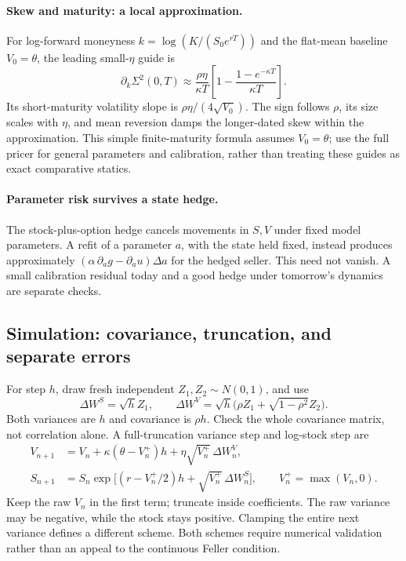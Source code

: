 \paragraph{Skew and maturity: a local approximation.}
For log-forward moneyness \(k=\log(K/(S_0e^{rT}))\) and the flat-mean
baseline \(V_0=\theta\), the leading small-\(\eta\) guide is
\[
\partial_k\Sigma^2(0,T)\approx\frac{\rho\eta}{\kappa T}
\left[1-\frac{1-e^{-\kappa T}}{\kappa T}\right].
\]
Its short-maturity volatility slope is \(\rho\eta/(4\sqrt{V_0})\).
The sign follows \(\rho\), its size scales with \(\eta\), and mean
reversion damps the longer-dated skew within the approximation. This
simple finite-maturity formula assumes \(V_0=\theta\); use the full
pricer for general parameters and calibration, rather than treating these
guides as exact comparative statics.

\paragraph{Parameter risk survives a state hedge.}
The stock-plus-option hedge cancels movements in \(S,V\) under fixed model
parameters. A refit of a parameter \(a\), with the state held fixed,
instead produces approximately
\((\alpha\,\partial_a g-\partial_a u)\Delta a\) for the hedged seller.
This need not vanish. A small calibration residual today and a good hedge
under tomorrow's dynamics are separate checks.

\subsection{Simulation: covariance, truncation, and separate errors}
For step \(h\), draw fresh independent \(Z_1,Z_2\sim N(0,1)\), and use
\[
\Delta W^S=\sqrt h Z_1,\qquad
\Delta W^V=\sqrt h\bigl(\rho Z_1+\sqrt{1-\rho^2}Z_2\bigr).
\]
Both variances are \(h\) and covariance is \(\rho h\). Check the whole
covariance matrix, not correlation alone. A full-truncation variance step
and log-stock step are
\[
\boxed{\begin{aligned}
V_{n+1}&=V_n+\kappa(\theta-V_n^+)h
+\eta\sqrt{V_n^+}\,\Delta W_n^V,\\
S_{n+1}&=S_n\exp\bigl[(r-V_n^+/2)h+\sqrt{V_n^+}\,\Delta W_n^S\bigr],
\qquad V_n^+=\max(V_n,0).
\end{aligned}}
\]
Keep the raw \(V_n\) in the first term; truncate inside coefficients.
The raw variance may be negative, while the stock stays positive.
Clamping the entire next variance defines a different scheme. Both
schemes require numerical validation rather than an appeal to the
continuous Feller condition.

